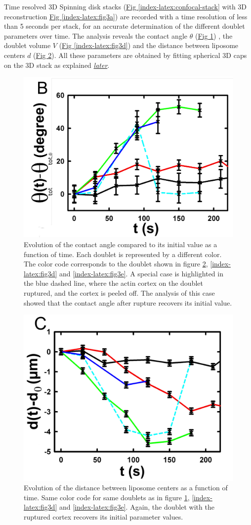 \documentclass[A4paperpaper,11pt,english]{sphinxmanual}
\begin{document}
Time resolved 3D Spinning disk stacks (\hyperref[index-latex:confocal-stack]{Fig  \ref*{index-latex:confocal-stack}} with 3D reconstruction
\hyperref[index-latex:fig3a]{Fig  \ref*{index-latex:fig3a}}) are recorded with a time resolution of less than 5 seconds per stack, for an accurate determination of the different
doublet parameters over time. The analysis reveals the contact angle \(\theta\) (\hyperref[index-latex:fig3b]{Fig  \ref*{index-latex:fig3b}}) , the
doublet volume \(V\) (\hyperref[index-latex:fig3d]{Fig  \ref*{index-latex:fig3d}}) and the distance between liposome
centers \(d\) (\hyperref[index-latex:fig3c]{Fig  \ref*{index-latex:fig3c}}). All these parameters are obtained by
fitting spherical 3D caps on the 3D stack as explained {\hyperref[index-latex:full3dfit]{\emph{later}}}.
\begin{figure}[htbp]
\centering
\capstart

\includegraphics[width=0.500\linewidth]{Fig_03-B.png}
\caption{Evolution of the contact angle compared to its initial value as a function of
time.  Each doublet is represented by a different color. The color code corresponds to the doublet
shown in figure \hyperref[index-latex:fig3c]{ \ref*{index-latex:fig3c}}, \hyperref[index-latex:fig3d]{ \ref*{index-latex:fig3d}}
and \hyperref[index-latex:fig3e]{ \ref*{index-latex:fig3e}}. A special case is highlighted in the blue dashed line,
where the actin cortex on the doublet ruptured, and the cortex is peeled off.
The analysis of this case showed that the contact angle after rupture recovers its initial value.}\label{index-latex:fig3b}\end{figure}
\begin{figure}[htbp]
\centering
\capstart

\includegraphics[width=0.500\linewidth]{Fig_03-C.png}
\caption{Evolution of the distance between liposome centers as a function of time.
Same color code for same doublets as in figure \hyperref[index-latex:fig3b]{ \ref*{index-latex:fig3b}}, \hyperref[index-latex:fig3d]{ \ref*{index-latex:fig3d}}
and \hyperref[index-latex:fig3e]{ \ref*{index-latex:fig3e}}. Again, the doublet with the ruptured cortex recovers its initial parameter values.}\label{index-latex:fig3c}\end{figure}
\end{document}
